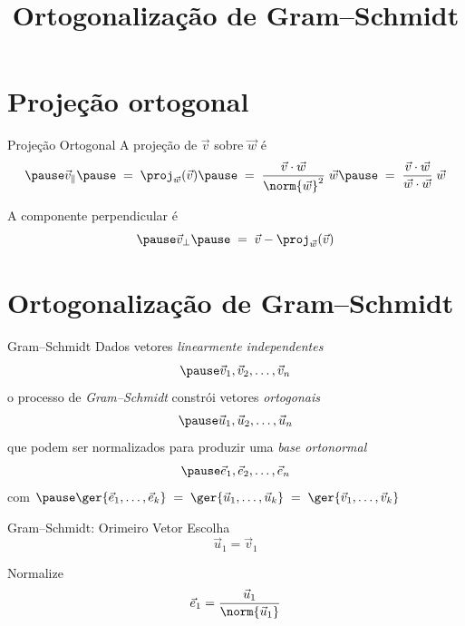 \documentclass[fleqn,aspectratio=169,12pt]{beamer}
\title{Ortogonalização de Gram--Schmidt}
\begin{document}
\addtitle

\section{Projeção ortogonal}

\begin{frame}{Projeção Ortogonal}
  A projeção de $\vec{v}$ sobre $\vec{w}$ é
  \[
    \pause
    \vec{v}_{\parallel}
    \pause
    \;=\; \proj_{\vec{w}}(\vec{v})
    \pause
    \;=\; \frac{\vec{v}\cdot\vec{w}} {\norm{\vec{w}}^{2}} \; \vec{w}
    \pause
    \;=\; \frac{\vec{v}\cdot\vec{w}} {\vec{w}\cdot\vec{w}} \; \vec{w}
  \]

  \pause
  A componente perpendicular é
  \[
    \pause
    \vec{v}_{\perp}
    \pause
    \;=\; \vec{v} - \proj_{\vec{w}}(\vec{v})
  \]
\end{frame}

\section{Ortogonalização de Gram--Schmidt}

\begin{frame}{Gram--Schmidt}
  Dados vetores \emph{linearmente independentes}
  \[
    \pause
    \vec{v}_1, \vec{v}_2, \ldots, \vec{v}_n
  \]
  \pause
  o processo de \emph{Gram--Schmidt} constrói vetores \emph{ortogonais}
  \[
    \pause
    \vec{u}_1, \vec{u}_2, \ldots, \vec{u}_n
  \]
  \pause
  que podem ser normalizados para produzir uma \emph{base ortonormal}
  \[
    \pause
    \vec{e}_1, \vec{e}_2, \ldots, \vec{e}_n
  \]
  \pause
  com \;
  \(
    \pause
    \ger \{\vec{e}_1,\ldots,\vec{e}_k\}
    \;=\; \ger \{\vec{u}_1,\ldots,\vec{u}_k\}
    \;=\; \ger \{\vec{v}_1,\ldots,\vec{v}_k\}
  \)
\end{frame}

\begin{frame}{Gram--Schmidt: Orimeiro Vetor}
  Escolha
  \[
    \vec{u}_1 = \vec{v}_1
  \]

  \pause
  Normalize
  \[
    \vec{e}_1 = \frac{\vec{u}_1}{\norm{\vec{u}_1}}
  \]
\end{frame}
\end{document}
